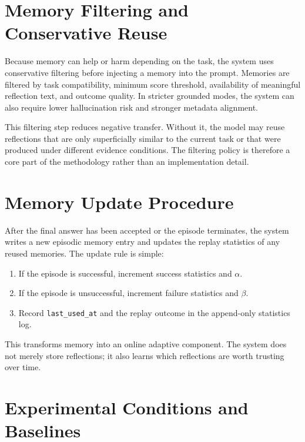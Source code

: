 \section{Memory Filtering and Conservative Reuse}
\label{sec:methodology-filtering}

Because memory can help or harm depending on the task, the system uses conservative filtering before injecting a memory into the prompt. Memories are filtered by task compatibility, minimum score threshold, availability of meaningful reflection text, and outcome quality. In stricter grounded modes, the system can also require lower hallucination risk and stronger metadata alignment.

This filtering step reduces negative transfer. Without it, the model may reuse reflections that are only superficially similar to the current task or that were produced under different evidence conditions. The filtering policy is therefore a core part of the methodology rather than an implementation detail.

\section{Memory Update Procedure}
\label{sec:methodology-memory-update}

After the final answer has been accepted or the episode terminates, the system writes a new episodic memory entry and updates the replay statistics of any reused memories. The update rule is simple:

\begin{enumerate}[leftmargin=*]
\item If the episode is successful, increment success statistics and $\alpha$.
\item If the episode is unsuccessful, increment failure statistics and $\beta$.
\item Record \texttt{last\_used\_at} and the replay outcome in the append-only statistics log.
\end{enumerate}

This transforms memory into an online adaptive component. The system does not merely store reflections; it also learns which reflections are worth trusting over time.

\section{Experimental Conditions and Baselines}
\label{sec:methodology-baselines}

